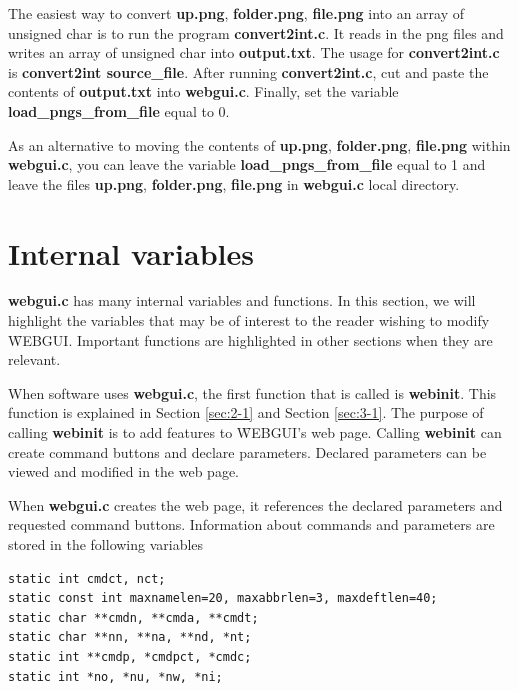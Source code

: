 The easiest way to convert \textbf{up.png}, \textbf{folder.png}, \textbf{file.png} into an array of unsigned char is to run
the program \textbf{convert2int.c}. It reads in the png files and writes an array of unsigned char into \textbf{output.txt}. The usage for
\textbf{convert2int.c} is \textbf{convert2int source\_file}. After running \textbf{convert2int.c}, cut 
and paste the contents of \textbf{output.txt} into \textbf{webgui.c}. Finally, set the variable \textbf{load\_pngs\_from\_file} equal to 0.
 
As an alternative to moving the contents of \textbf{up.png}, \textbf{folder.png}, \textbf{file.png} within \textbf{webgui.c}, you can leave the variable
\textbf{load\_pngs\_from\_file} equal to 1 and leave the files \textbf{up.png}, \textbf{folder.png}, \textbf{file.png} in \textbf{webgui.c} local directory.

\section{Internal variables}
\label{sec:7-1}

\textbf{webgui.c} has many internal variables and functions. In this section, we will highlight the variables that
may be of interest to the reader wishing to modify \f{WEBGUI}. Important functions are highlighted in other sections when they
are relevant.

When software uses \textbf{webgui.c}, the first function that is called
is \textbf{webinit}. This function is explained in Section \ref{sec:2-1} and Section \ref{sec:3-1}. The purpose of calling \textbf{webinit}
is to add features to \f{WEBGUI}'s web page. Calling \textbf{webinit} can create command buttons and declare parameters. 
Declared parameters can be viewed and modified in the web page.

When \textbf{webgui.c} creates the web page, it references the declared parameters and requested command buttons. Information
about commands and parameters are stored in the following variables
\begin{verbatim}
static int cmdct, nct;
static const int maxnamelen=20, maxabbrlen=3, maxdeftlen=40;
static char **cmdn, **cmda, **cmdt;
static char **nn, **na, **nd, *nt;
static int **cmdp, *cmdpct, *cmdc;
static int *no, *nu, *nw, *ni;
\end{verbatim}

